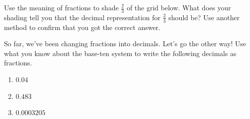 \documentclass[noauthor, nooutcomes, handout]{ximera}
\begin{document}
\begin{problem}
Use the meaning of fractions to shade $\frac{2}{3}$ of the grid below. What does your shading tell you that the decimal representation for $\frac{2}{3}$ should be? Use another method to confirm that you got the correct answer.
\begin{center}
\end{center}
\end{problem}



\begin{problem}
So far, we've been changing fractions into decimals. Let's go the other way! Use what you know about the base-ten system to write the following decimals as fractions.
\begin{enumerate}
    \item $0.04$
    \item $0.483$
    \item $0.0003205$
\end{enumerate}
\end{problem}
\end{document}
